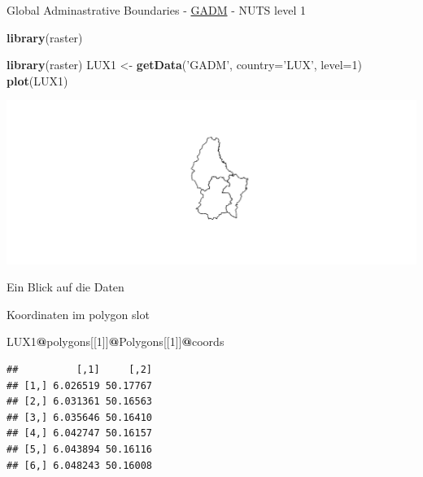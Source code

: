 \documentclass[ignorenonframetext,]{beamer}
\newenvironment{Shaded}{\begin{snugshade}}{\end{snugshade}}
\newcommand{\KeywordTok}[1]{\textcolor[rgb]{0.13,0.29,0.53}{\textbf{#1}}}
\newcommand{\DataTypeTok}[1]{\textcolor[rgb]{0.13,0.29,0.53}{#1}}
\newcommand{\DecValTok}[1]{\textcolor[rgb]{0.00,0.00,0.81}{#1}}
\newcommand{\StringTok}[1]{\textcolor[rgb]{0.31,0.60,0.02}{#1}}
\newcommand{\OperatorTok}[1]{\textcolor[rgb]{0.81,0.36,0.00}{\textbf{#1}}}
\newcommand{\NormalTok}[1]{#1}
\begin{document}
\begin{frame}[fragile]{Global Adminastrative Boundaries -
\href{http://www.gadm.org/}{GADM} - NUTS level 1}

\begin{Shaded}
\begin{Highlighting}[]
\KeywordTok{library}\NormalTok{(raster)}
\end{Highlighting}
\end{Shaded}

\begin{Shaded}
\begin{Highlighting}[]
\KeywordTok{library}\NormalTok{(raster)}
\NormalTok{LUX1 <-}\StringTok{ }\KeywordTok{getData}\NormalTok{(}\StringTok{'GADM'}\NormalTok{, }\DataTypeTok{country=}\StringTok{'LUX'}\NormalTok{, }\DataTypeTok{level=}\DecValTok{1}\NormalTok{)}
\KeywordTok{plot}\NormalTok{(LUX1)}
\end{Highlighting}
\end{Shaded}

\includegraphics{slides_all2gether_part1_files/figure-beamer/unnamed-chunk-152-1.pdf}

\end{frame}

\begin{frame}[fragile]{Ein Blick auf die Daten}

Koordinaten im polygon slot

\begin{Shaded}
\begin{Highlighting}[]
\NormalTok{LUX1}\OperatorTok{@}\NormalTok{polygons[[}\DecValTok{1}\NormalTok{]]}\OperatorTok{@}\NormalTok{Polygons[[}\DecValTok{1}\NormalTok{]]}\OperatorTok{@}\NormalTok{coords}
\end{Highlighting}
\end{Shaded}

\begin{verbatim}
##          [,1]     [,2]
## [1,] 6.026519 50.17767
## [2,] 6.031361 50.16563
## [3,] 6.035646 50.16410
## [4,] 6.042747 50.16157
## [5,] 6.043894 50.16116
## [6,] 6.048243 50.16008
\end{verbatim}

\end{frame}
\end{document}
